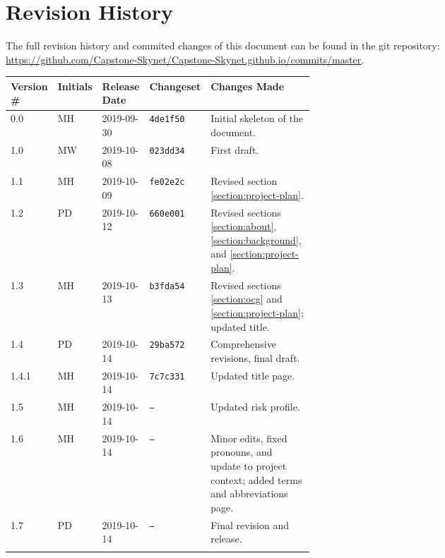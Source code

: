\thispagestyle{empty}
\section*{Revision History}
The full revision history and commited changes of this document can be found in the git repository: \\
\href{https://github.com/Capstone-Skynet/Capstone-Skynet.github.io}{https://github.com/Capstone-Skynet/Capstone-Skynet.github.io/commits/master}.

\begin{table}[H]
\begin{tabular}{*{4}{l}p{0.5\linewidth}}
\hline
Version \# & Initials & Release Date & Changeset & Changes Made \\ \hline

0.0 & MH & 2019-09-30 & \texttt{4de1f50} & Initial skeleton of the document.\\
1.0 & MW & 2019-10-08 & \texttt{023dd34} & First draft.\\
1.1 & MH & 2019-10-09 & \texttt{fe02e2c} & Revised section \ref{section:project-plan}.\\
1.2 & PD & 2019-10-12 & \texttt{660e001} & Revised sections \ref{section:about}, \ref{section:background}, and \ref{section:project-plan}.\\
1.3 & MH & 2019-10-13 & \texttt{b3fda54} & Revised sections \ref{section:ocg} and \ref{section:project-plan}; updated title.\\
1.4 & PD & 2019-10-14 & \texttt{29ba572} & Comprehensive revisions, final draft.\\
1.4.1 & MH & 2019-10-14 & \texttt{7c7c331} & Updated title page. \\
1.5 & MH & 2019-10-14 & \texttt{--} & Updated risk profile. \\
1.6 & MH & 2019-10-14 & \texttt{--} & Minor edits, fixed pronouns, and update to project context; added terms and abbreviations page.\\
1.7 & PD & 2019-10-14 & \texttt{--} & Final revision and release.\\


 & & & \\ \hline
\end{tabular}
\end{table}